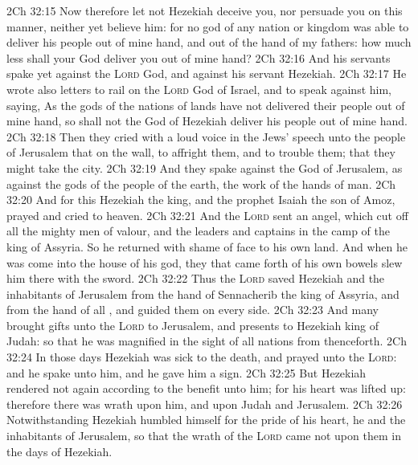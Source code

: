 \vs 2Ch 32:15 Now therefore let not Hezekiah deceive you, nor persuade you on this manner, neither yet believe him: for no god of any nation or kingdom was able to deliver his people out of mine hand, and out of the hand of my fathers: how much less shall your God deliver you out of mine hand?
\vs 2Ch 32:16 And his servants spake yet  against the \textsc{Lord} God, and against his servant Hezekiah.
\vs 2Ch 32:17 He wrote also letters to rail on the \textsc{Lord} God of Israel, and to speak against him, saying, As the gods of the nations of  lands have not delivered their people out of mine hand, so shall not the God of Hezekiah deliver his people out of mine hand.
\vs 2Ch 32:18 Then they cried with a loud voice in the Jews' speech unto the people of Jerusalem that  on the wall, to affright them, and to trouble them; that they might take the city.
\vs 2Ch 32:19 And they spake against the God of Jerusalem, as against the gods of the people of the earth,  the work of the hands of man.
\vs 2Ch 32:20 And for this  Hezekiah the king, and the prophet Isaiah the son of Amoz, prayed and cried to heaven.
\vs 2Ch 32:21 And the \textsc{Lord} sent an angel, which cut off all the mighty men of valour, and the leaders and captains in the camp of the king of Assyria. So he returned with shame of face to his own land. And when he was come into the house of his god, they that came forth of his own bowels slew him there with the sword.
\vs 2Ch 32:22 Thus the \textsc{Lord} saved Hezekiah and the inhabitants of Jerusalem from the hand of Sennacherib the king of Assyria, and from the hand of all , and guided them on every side.
\vs 2Ch 32:23 And many brought gifts unto the \textsc{Lord} to Jerusalem, and presents to Hezekiah king of Judah: so that he was magnified in the sight of all nations from thenceforth.
\vs 2Ch 32:24 In those days Hezekiah was sick to the death, and prayed unto the \textsc{Lord}: and he spake unto him, and he gave him a sign.
\vs 2Ch 32:25 But Hezekiah rendered not again according to the benefit  unto him; for his heart was lifted up: therefore there was wrath upon him, and upon Judah and Jerusalem.
\vs 2Ch 32:26 Notwithstanding Hezekiah humbled himself for the pride of his heart,  he and the inhabitants of Jerusalem, so that the wrath of the \textsc{Lord} came not upon them in the days of Hezekiah.
